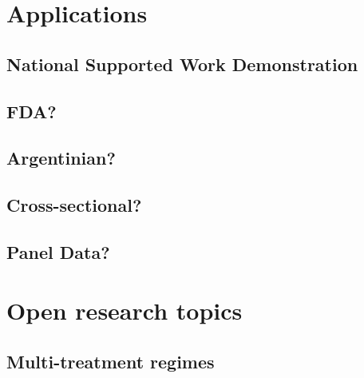 \documentclass[11pt,titlepage]{article}
\begin{document}
                                                                                                                          
\section{Applications}
\subsection{National Supported Work Demonstration}
\subsection{FDA?}
\subsection{Argentinian?}
\subsection{Cross-sectional?}
\subsection{Panel Data?}
                                                                                                                                                             
 
\section{Open research topics}
\subsection{Multi-treatment regimes}
\end{document}
